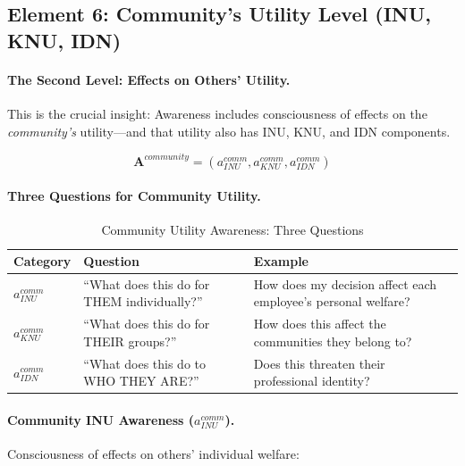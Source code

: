 \subsection{Element 6: Community's Utility Level (INU, KNU, IDN)}
\label{subsec:community-utility}

\paragraph{The Second Level: Effects on Others' Utility.}
This is the crucial insight: Awareness includes consciousness of effects on 
the \emph{community's} utility---and that utility also has INU, KNU, and IDN 
components.

\begin{equation}
\mathbf{A}^{community} = (a^{comm}_{INU}, a^{comm}_{KNU}, a^{comm}_{IDN})
\end{equation}

\paragraph{Three Questions for Community Utility.}

\begin{table}[htbp]
\centering
\caption{Community Utility Awareness: Three Questions}
\label{tab:community-utility-questions}
\renewcommand{\arraystretch}{1.4}
\begin{tabular}{@{}lp{5cm}p{5cm}@{}}
\toprule
\textbf{Category} & \textbf{Question} & \textbf{Example} \\
\midrule
$a^{comm}_{INU}$ & ``What does this do for THEM individually?'' & How does my decision affect each employee's personal welfare? \\
$a^{comm}_{KNU}$ & ``What does this do for THEIR groups?'' & How does this affect the communities they belong to? \\
$a^{comm}_{IDN}$ & ``What does this do to WHO THEY ARE?'' & Does this threaten their professional identity? \\
\bottomrule
\end{tabular}
\end{table}

\paragraph{Community INU Awareness ($a^{comm}_{INU}$).}
Consciousness of effects on others' individual welfare:

